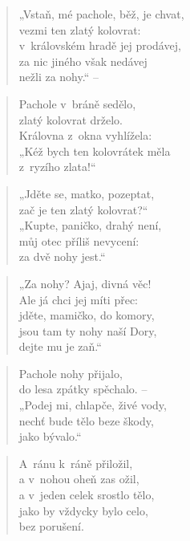 \begin{verse}
„Vstaň, mé pachole, běž, je chvat, \\
vezmi ten zlatý kolovrat: \\
v~královském hradě jej prodávej, \\
za nic jiného však nedávej \\
nežli za nohy.“ --
\end{verse}

\begin{verse}
Pachole v~bráně sedělo, \\
zlatý kolovrat drželo. \\
Královna z~okna vyhlížela: \\
„Kéž bych ten kolovrátek měla \\
z~ryzího zlata!“
\end{verse}

\begin{verse}
„Jděte se, matko, pozeptat, \\
zač je ten zlatý kolovrat?“ \\
„Kupte, paničko, drahý není, \\
můj otec příliš nevycení: \\
za dvě nohy jest.“
\end{verse}

\begin{verse}
„Za nohy? Ajaj, divná věc! \\
Ale já chci jej míti přec: \\
jděte, mamičko, do komory, \\
jsou tam ty nohy naší Dory, \\
dejte mu je zaň.“
\end{verse}

\begin{verse}
Pachole nohy přijalo, \\
do lesa zpátky spěchalo. -- \\
„Podej mi, chlapče, živé vody, \\
nechť bude tělo beze škody, \\
jako bývalo.“
\end{verse}

\begin{verse}
A~ránu k~ráně přiložil, \\
a v~nohou oheň zas ožil, \\
a v~jeden celek srostlo tělo, \\
jako by vždycky bylo celo, \\
bez porušení.
\end{verse}

